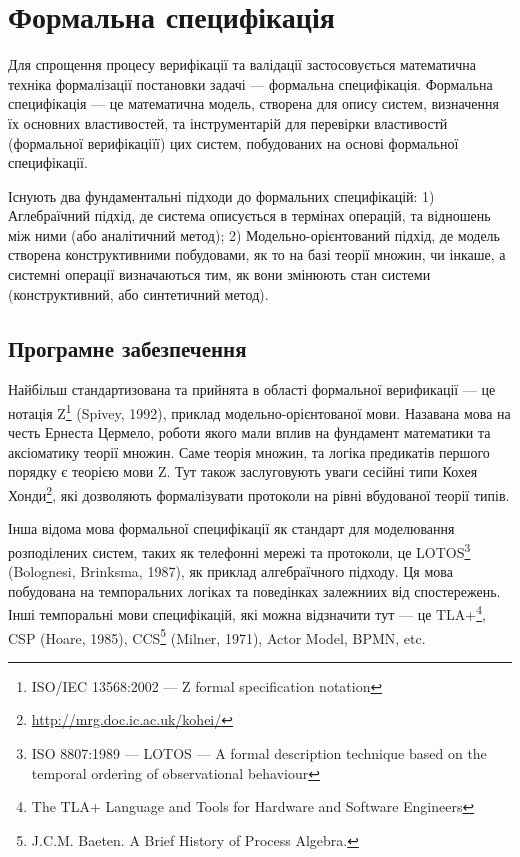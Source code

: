 \section{Формальна специфікація}
Для спрощення процесу верифікації та валідації
застосовується математична техніка формалізації постановки задачі --- формальна специфікація.
Формальна специфікація --- це математична модель, створена для опису систем,
визначення їх основних властивостей, та інструментарій для перевірки
властивостй (формальної верифікаціїї) цих систем, побудованих на основі формальної специфікації.

Існують два фундаментальні підходи до формальних специфікацій:
1) Аглебраїчний підхід, де система описується в термінах операцій, та відношень між ними (або аналітичний метод);
2) Модельно-орієнтований підхід, де модель створена конструктивними побудовами,
   як то на базі теорії множин, чи інкаше, а системні операції визначаються тим,
   як вони змінюють стан системи (конструктивний, або синтетичний метод).

\subsection{Програмне забезпечення}
Найбільш стандартизована та прийнята в області формальної верификації --- це нотація
Z\footnote{ISO/IEC 13568:2002 --- Z formal specification notation} (Spivey, 1992), приклад
модельно-орієнтованої мови. Назавана мова на честь Ернеста Цермело, роботи якого мали вплив на
фундамент математики та аксіоматику теорії множин. Саме теорія множин, та логіка предикатів
першого порядку є теорією мови Z. Тут також заслуговують уваги сесійні типи
Кохея Хонди\footnote{\url{ http://mrg.doc.ic.ac.uk/kohei/}}, які дозволяють
формалізувати протоколи на рівні вбудованої теорії типів.

Інша відома мова формальної специфікації як стандарт
для моделювання розподілених систем, таких як телефонні мережі та протоколи, це
LOTOS\footnote{ISO 8807:1989 --- LOTOS --- A formal description technique based
on the temporal ordering of observational behaviour} (Bolognesi, Brinksma, 1987),
як приклад алгебраїчного підходу.
Ця мова побудована на темпоральних логіках та поведінках залежниих від спостережень.
Інші темпоральні мови специфікацій, які можна відзначити тут --- це TLA+\footnote{The
TLA+ Language and Tools for Hardware and Software Engineers}, CSP (Hoare, 1985),
CCS\footnote{J.C.M. Baeten. A Brief History of Process Algebra.} (Milner, 1971), Actor Model, BPMN, etc.

